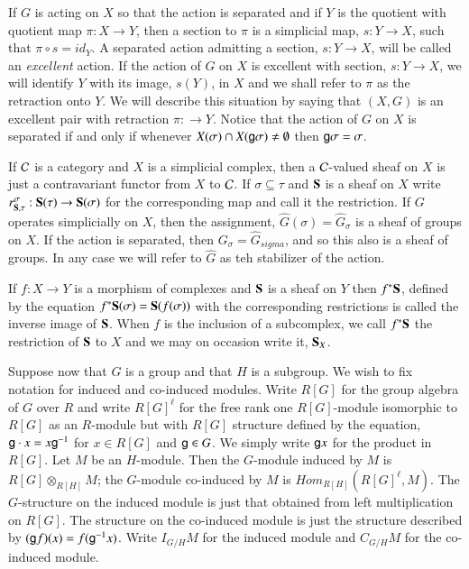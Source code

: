 If $G$ is acting on $X$ so that the action is separated and if $Y$ is the quotient with quotient map $\pi : X\rightarrow Y$, then a section to $\pi$ is a simplicial map, $s: Y \rightarrow X$, such that $\pi \circ s = id_{Y}$. A separated action admitting a section, $s : Y \rightarrow X$, will be called an \textit{excellent} action. If the action of $G$ on $X$ is excellent with section, $s: Y\rightarrow X$, we will identify $Y$ with its image, $s(Y)$, in $X$ and we shall refer to $\pi$ as the retraction onto $Y$. We will describe this situation by saying that $(X, G)$ is an excellent pair with retraction $\pi : \rightarrow Y$. Notice that the action of $G$ on $X$ is separated if and only if whenever $X(\sigma) \cap X(\mathsf{g}\sigma)\neq \emptyset$ then $\mathsf{g}\sigma = \sigma$.

If $\mathcal{C}$ is a category and $X$ is a simplicial complex, then a $\mathcal{C}$-valued sheaf on $X$ is just a contravariant functor from $X$ to $\mathcal{C}$. If $\sigma \subseteq \tau$ and $\mathbf{S}$ is a sheaf on $X$ write $r_{\mathbf{S}, \tau}^{\sigma} : \mathbf{S}(\tau) \rightarrow \mathbf{S}(\sigma)$ for the corresponding map and call it the restriction. If $G$ operates simplicially on $X$, then the assignment, $\hat{G}(\sigma) = \hat{G}_{\sigma}$ is a sheaf of groups on $X$. If the action is separated, then $G_{\sigma} = \hat{G}_{sigma}$, and so this also is a sheaf of groups. In any case we will refer to $\hat{G}$ as teh stabilizer of the action.

If $f : X \rightarrow Y$ is a morphism of complexes and $\mathbf{S}$ is a sheaf on $Y$ then $f^{*}\mathbf{S}$, defined by the equation $f^{*}\mathbf{S}(\sigma) = \mathbf{S}(f(\sigma))$ with the corresponding restrictions is called the inverse image of $\mathbf{S}$. When $f$ is the inclusion of a subcomplex, we call $f^{*}\mathbf{S}$ the restriction of $\mathbf{S}$ to $X$ and we may on occasion write it, $\mathbf{S}_{X}$.

Suppose now that $G$ is a group and that $H$ is a subgroup. We wish to fix notation for induced and co-induced modules. Write $R[G]$ for the group algebra of $G$ over $R$ and write $R[G]^{\ell}$ for the free rank one $R[G]$-module isomorphic to $R[G]$  as an $R$-module but with $R[G]$ structure defined by the equation, $\mathsf{g} \cdot x = x\mathsf{g}^{-1}$ for $x \in R[G]$ and $\mathsf{g} \in G$. We simply write $\mathsf{g} x$ for the product in $R[G]$. Let $M$ be an $H$-module. Then the $G$-module induced by $M$ is $R[G] \otimes_{R[H]}M$; the $G$-module co-induced by $M$ is $Hom_{R[H]}(R[G]^{\ell}, M)$. The $G$-structure on the induced module is just that obtained from left multiplication on $R[G]$. The structure on the co-induced module is just the structure described by $(\mathsf{g} f)(x)= f(\mathsf{g}^{-1} x)$. Write $I_{G/H}M$ for the induced module and $C_{G/H}M$ for the co-induced module.

